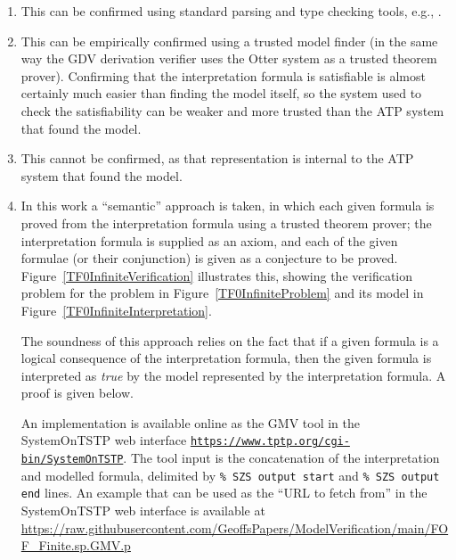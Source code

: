 \documentclass[letterpaper]{article}
\newcommand{\smalltt}[1]{\small \texttt{#1}}
\begin{document}
\begin{enumerate}
\item This can be confirmed using standard parsing and type checking tools, e.g., \cite{VS06,HR15}.
\item This can be empirically confirmed using a trusted model finder (in the same way the GDV 
      derivation verifier \cite{Sut06} uses the Otter system \cite{McC03-Otter} as a trusted 
      theorem prover).
      Confirming that the \small{interpretation} formula is satisfiable is almost certainly much 
      easier than finding the model itself, so the system used to check the satisfiability can 
      be weaker and more trusted than the ATP system that found the model.
\item This cannot be confirmed, as that representation is internal to the ATP system that found
      the model.
\item In this work a ``semantic'' approach is taken, in which each given formula is proved from
      the interpretation formula using a trusted theorem prover; the interpretation formula is 
      supplied as an axiom, and each of the given formulae (or their conjunction) is given as a 
      conjecture to be proved.
      Figure~\ref{TF0InfiniteVerification} illustrates this, showing the verification 
      problem for the problem in Figure~\ref{TF0InfiniteProblem} and its model in 
      Figure~\ref{TF0InfiniteInterpretation}.

      The soundness of this approach relies on the fact that if a given formula is a logical 
      consequence of the interpretation formula, then the given formula is interpreted as 
      {\em true} by the model represented by the interpretation formula.
      A proof is given below.

      An implementation is available online as the GMV tool in the SystemOnTSTP \cite{Sut07-CSR} 
      web interface \smalltt{\url{https://www.tptp.org/cgi-bin/SystemOnTSTP}}.
      The tool input is the concatenation of the interpretation and modelled formula,
      delimited by \smalltt{\% SZS output start} and \smalltt{\% SZS output end} lines.
      An example that can be used as the ``URL to fetch from'' in the SystemOnTSTP web 
      interface is available at
      {\scriptsize \url{https://raw.githubusercontent.com/GeoffsPapers/ModelVerification/main/FOF_Finite.sp.GMV.p}}

\end{enumerate}
\end{document}
